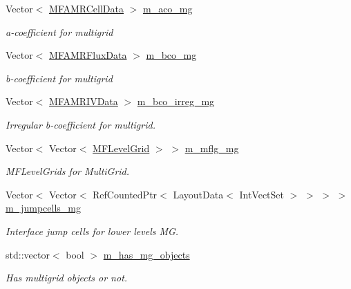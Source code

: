 \begin{DoxyCompactItemize}
Vector$<$ \hyperlink{type__definitions_8H_aced885351d40daa466564acbee4042d3}{M\+F\+A\+M\+R\+Cell\+Data} $>$ \hyperlink{classnwomfconductivityopfactory_ab0f4b31d802557fbd5c5a89516c27265}{m\+\_\+aco\+\_\+mg}
\begin{DoxyCompactList}\small\item\em a-\/coefficient for multigrid \end{DoxyCompactList}\item 
Vector$<$ \hyperlink{type__definitions_8H_a4033d82364b7e6655b58257749d7881f}{M\+F\+A\+M\+R\+Flux\+Data} $>$ \hyperlink{classnwomfconductivityopfactory_a97b4687e104c912f489dbb413da863b0}{m\+\_\+bco\+\_\+mg}
\begin{DoxyCompactList}\small\item\em b-\/coefficient for multigrid \end{DoxyCompactList}\item 
Vector$<$ \hyperlink{type__definitions_8H_a559707b00625e419df1a59d9501220de}{M\+F\+A\+M\+R\+I\+V\+Data} $>$ \hyperlink{classnwomfconductivityopfactory_a4309c469bde096c912c2253bfc7afbff}{m\+\_\+bco\+\_\+irreg\+\_\+mg}
\begin{DoxyCompactList}\small\item\em Irregular b-\/coefficient for multigrid. \end{DoxyCompactList}\item 
Vector$<$ Vector$<$ \hyperlink{classMFLevelGrid}{M\+F\+Level\+Grid} $>$ $>$ \hyperlink{classnwomfconductivityopfactory_a36ef39139654ba4b80857d598e9a7bba}{m\+\_\+mflg\+\_\+mg}
\begin{DoxyCompactList}\small\item\em M\+F\+Level\+Grids for Multi\+Grid. \end{DoxyCompactList}\item 
Vector$<$ Vector$<$ Ref\+Counted\+Ptr$<$ Layout\+Data$<$ Int\+Vect\+Set $>$ $>$ $>$ $>$ \hyperlink{classnwomfconductivityopfactory_ae8c6afddfc8dc92f9eb1a7d7ba9c89e0}{m\+\_\+jumpcells\+\_\+mg}
\begin{DoxyCompactList}\small\item\em Interface jump cells for lower levels MG. \end{DoxyCompactList}\item 
std\+::vector$<$ bool $>$ \hyperlink{classnwomfconductivityopfactory_af6e7be6ddca5cf1d6ce2a8ee16223d7e}{m\+\_\+has\+\_\+mg\+\_\+objects}
\begin{DoxyCompactList}\small\item\em Has multigrid objects or not. \end{DoxyCompactList}\item 

\end{DoxyCompactItemize}

